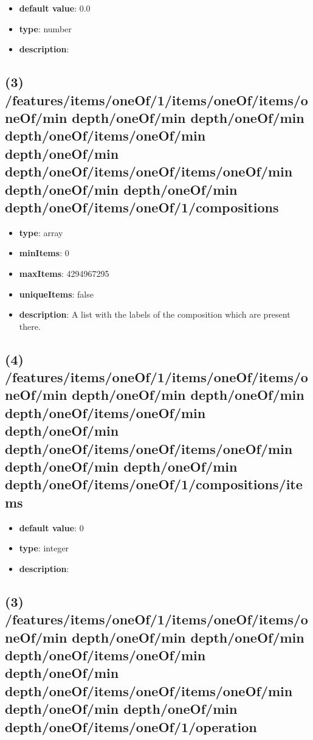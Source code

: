 \begin{itemize}[leftmargin=4em]\item {\bf default value}: 0.0
\item {\bf type}: number
\item {\bf description}: 
\end{itemize}\subsection{(3) /features/items/oneOf/1/items/oneOf/items/oneOf/min depth/oneOf/min depth/oneOf/min depth/oneOf/items/oneOf/min depth/oneOf/min depth/oneOf/items/oneOf/items/oneOf/min depth/oneOf/min depth/oneOf/min depth/oneOf/items/oneOf/1/compositions}
\begin{itemize}[leftmargin=3em]\item {\bf type}: array
\item {\bf minItems}: 0
\item {\bf maxItems}: 4294967295
\item {\bf uniqueItems}: false
\item {\bf description}: A list with the labels of the composition which are present there.
\end{itemize}\subsection{(4) /features/items/oneOf/1/items/oneOf/items/oneOf/min depth/oneOf/min depth/oneOf/min depth/oneOf/items/oneOf/min depth/oneOf/min depth/oneOf/items/oneOf/items/oneOf/min depth/oneOf/min depth/oneOf/min depth/oneOf/items/oneOf/1/compositions/items}
\begin{itemize}[leftmargin=4em]\item {\bf default value}: 0
\item {\bf type}: integer
\item {\bf description}: 
\end{itemize}\subsection{(3) /features/items/oneOf/1/items/oneOf/items/oneOf/min depth/oneOf/min depth/oneOf/min depth/oneOf/items/oneOf/min depth/oneOf/min depth/oneOf/items/oneOf/items/oneOf/min depth/oneOf/min depth/oneOf/min depth/oneOf/items/oneOf/1/operation}
